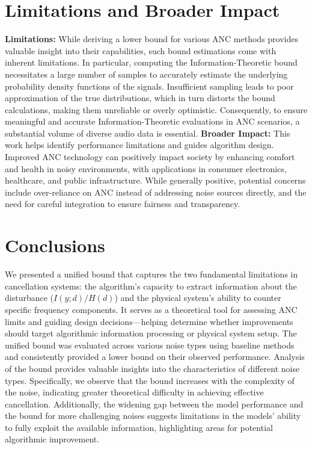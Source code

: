\documentclass{article}
\begin{document}
\section{Limitations and Broader Impact}
\textbf{Limitations:} While deriving a lower bound for various ANC methods provides valuable insight into their capabilities, such bound estimations come with inherent limitations. In particular, computing the Information-Theoretic bound necessitates a large number of samples to accurately estimate the underlying probability density functions of the signals. Insufficient sampling leads to poor approximation of the true distributions, which in turn distorts the bound calculations, making them unreliable or overly optimistic. Consequently, to ensure meaningful and accurate Information-Theoretic evaluations in ANC scenarios, a substantial volume of diverse audio data is essential. \textbf{Broader Impact:} This work helps identify performance limitations and guides algorithm design. Improved ANC technology can positively impact society by enhancing comfort and health in noisy environments, with applications in consumer electronics, healthcare, and public infrastructure. While generally positive, potential concerns include over-reliance on ANC instead of addressing noise sources directly, and the need for careful integration to ensure fairness and transparency.



\section{Conclusions}

We presented a unified bound that captures the two fundamental limitations in cancellation systems: the algorithm's capacity to extract information about the disturbance (\( I(y;d) / H(d) \)) and the physical system's ability to counter specific frequency components. It serves as a theoretical tool for assessing ANC limits and guiding design decisions—helping determine whether improvements should target algorithmic information processing or physical system setup. The unified bound was evaluated across various noise types using baseline methods and consistently provided a lower bound on their observed performance. Analysis of the bound provides valuable insights into the characteristics of different noise types. Specifically, we observe that the bound increases with the complexity of the noise, indicating greater theoretical difficulty in achieving effective cancellation. Additionally, the widening gap between the model performance and the bound for more challenging noises suggests limitations in the models’ ability to fully exploit the available information, highlighting areas for potential algorithmic improvement.
\end{document}
